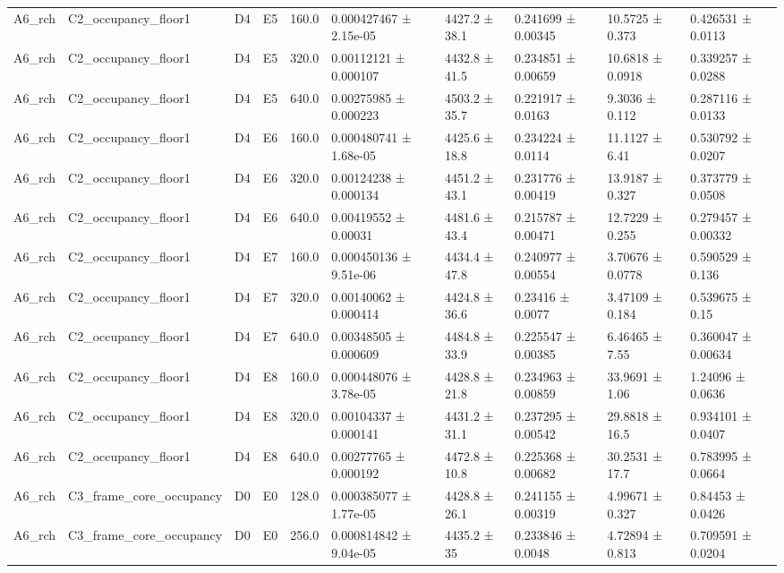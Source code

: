 \begin{table}
\begin{tabular}{llllllllll}
A6\_rch & C2\_occupancy\_floor1 & D4 & E5 & 160.0 & 0.000427467 ± 2.15e-05 & 4427.2 ± 38.1 & 0.241699 ± 0.00345 & 10.5725 ± 0.373 & 0.426531 ± 0.0113 \\
A6\_rch & C2\_occupancy\_floor1 & D4 & E5 & 320.0 & 0.00112121 ± 0.000107 & 4432.8 ± 41.5 & 0.234851 ± 0.00659 & 10.6818 ± 0.0918 & 0.339257 ± 0.0288 \\
A6\_rch & C2\_occupancy\_floor1 & D4 & E5 & 640.0 & 0.00275985 ± 0.000223 & 4503.2 ± 35.7 & 0.221917 ± 0.0163 & 9.3036 ± 0.112 & 0.287116 ± 0.0133 \\
A6\_rch & C2\_occupancy\_floor1 & D4 & E6 & 160.0 & 0.000480741 ± 1.68e-05 & 4425.6 ± 18.8 & 0.234224 ± 0.0114 & 11.1127 ± 6.41 & 0.530792 ± 0.0207 \\
A6\_rch & C2\_occupancy\_floor1 & D4 & E6 & 320.0 & 0.00124238 ± 0.000134 & 4451.2 ± 43.1 & 0.231776 ± 0.00419 & 13.9187 ± 0.327 & 0.373779 ± 0.0508 \\
A6\_rch & C2\_occupancy\_floor1 & D4 & E6 & 640.0 & 0.00419552 ± 0.00031 & 4481.6 ± 43.4 & 0.215787 ± 0.00471 & 12.7229 ± 0.255 & 0.279457 ± 0.00332 \\
A6\_rch & C2\_occupancy\_floor1 & D4 & E7 & 160.0 & 0.000450136 ± 9.51e-06 & 4434.4 ± 47.8 & 0.240977 ± 0.00554 & 3.70676 ± 0.0778 & 0.590529 ± 0.136 \\
A6\_rch & C2\_occupancy\_floor1 & D4 & E7 & 320.0 & 0.00140062 ± 0.000414 & 4424.8 ± 36.6 & 0.23416 ± 0.0077 & 3.47109 ± 0.184 & 0.539675 ± 0.15 \\
A6\_rch & C2\_occupancy\_floor1 & D4 & E7 & 640.0 & 0.00348505 ± 0.000609 & 4484.8 ± 33.9 & 0.225547 ± 0.00385 & 6.46465 ± 7.55 & 0.360047 ± 0.00634 \\
A6\_rch & C2\_occupancy\_floor1 & D4 & E8 & 160.0 & 0.000448076 ± 3.78e-05 & 4428.8 ± 21.8 & 0.234963 ± 0.00859 & 33.9691 ± 1.06 & 1.24096 ± 0.0636 \\
A6\_rch & C2\_occupancy\_floor1 & D4 & E8 & 320.0 & 0.00104337 ± 0.000141 & 4431.2 ± 31.1 & 0.237295 ± 0.00542 & 29.8818 ± 16.5 & 0.934101 ± 0.0407 \\
A6\_rch & C2\_occupancy\_floor1 & D4 & E8 & 640.0 & 0.00277765 ± 0.000192 & 4472.8 ± 10.8 & 0.225368 ± 0.00682 & 30.2531 ± 17.7 & 0.783995 ± 0.0664 \\
A6\_rch & C3\_frame\_core\_occupancy & D0 & E0 & 128.0 & 0.000385077 ± 1.77e-05 & 4428.8 ± 26.1 & 0.241155 ± 0.00319 & 4.99671 ± 0.327 & 0.84453 ± 0.0426 \\
A6\_rch & C3\_frame\_core\_occupancy & D0 & E0 & 256.0 & 0.000814842 ± 9.04e-05 & 4435.2 ± 35 & 0.233846 ± 0.0048 & 4.72894 ± 0.813 & 0.709591 ± 0.0204 \\

\end{tabular}
\end{table}
